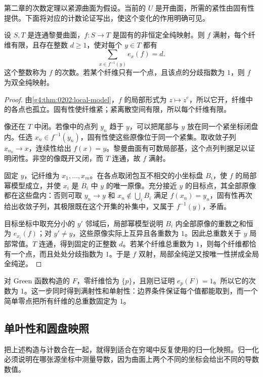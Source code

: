 第二章的次数定理以紧源曲面为假设。当前的 \(U\) 是开曲面，所需的紧性由固有性提供。下面将对应的计数论证写出，使这个变化的作用明确可见。

\begin{proposition}
	\label{g4:prop:0502:proper-degree}
	设 \(S,T\) 是连通黎曼曲面，\(f:S\to T\) 是固有的非恒定全纯映射。则 \(f\) 满射，每个纤维有限，且存在整数 \(d\ge1\)，使对每个 \(y\in T\) 都有
	\[
		\sum_{x\in f^{-1}(y)}e_x(f)=d.
	\]
	这个整数称为 \(f\) 的次数。若某个纤维只有一个点，且该点的分歧指数为 \(1\)，则 \(f\) 为双全纯映射。
\end{proposition}
\begin{proof}
	由\cref{g4:thm:0202:local-model}，\(f\) 的局部形式为 \(z\mapsto z^e\)，所以它开，纤维中的各点也孤立。固有性使纤维紧；紧离散空间有限，所以每个纤维有限。

	像还在 \(T\) 中闭。若像中的点列 \(y_n\) 趋于 \(y\)，可以把尾部与 \(y\) 放在同一个紧坐标闭盘内。任选 \(x_n\in f^{-1}(y_n)\)，固有性使这些原像位于同一个紧集。取收敛子列 \(x_{n_k}\to x\)，连续性给出 \(f(x)=y\)。黎曼曲面有可数局部基，这个点列判据足以证明闭性。非空的像既开又闭，而 \(T\) 连通，故 \(f\) 满射。

	固定 \(y\)，记纤维为 \(x_1,\ldots,x_m\)。在各点取闭包互不相交的小坐标盘 \(B_i\)，使 \(f\) 的局部幂模型成立，并使 \(x_i\) 是 \(\overline B_i\) 中 \(y\) 的唯一原像。充分接近 \(y\) 的目标点，其全部原像都在这些盘内：否则可取 \(y_n\to y\) 和 \(x_n\notin\bigcup_iB_i\) 满足 \(f(x_n)=y_n\)，固有性再次给出收敛子列，其极限既在这个开集的补集中，又属于 \(f^{-1}(y)\)，矛盾。

	目标坐标中取充分小的 \(y'\) 邻域后，局部幂模型说明 \(B_i\) 内全部原像的重数之和恒为 \(e_{x_i}(f)\)；对 \(y'\ne y\)，这些原像实际上互异且各重数为 \(1\)。因此总重数关于 \(y\) 局部常值。\(T\) 连通，得到固定的正整数 \(d\)。若某个纤维总重数为 \(1\)，则每个纤维都恰有一个点，而且处处分歧指数为 \(1\)。于是 \(f\) 双射，局部全纯逆又按唯一性拼成全局全纯逆。
\end{proof}

对 Green 函数构造的 \(F\)，零纤维恰为 \(\{p\}\)，且刚已证明 \(e_p(F)=1\)。所以它的次数为 \(1\)。这一步同时得到满射性和单射性：边界条件保证每个值都能取到，而一个简单零点把所有纤维的总重数固定为 \(1\)。

\subsection{单叶性和圆盘映照}
\label{g4:subsec:0502:04}

把上述构造与计数合在一起，就得到适合在穷竭中反复使用的归一化映照。归一化必须说明在哪张源坐标中测量导数，因为曲面上两个不同的坐标会给出不同的导数数值。

